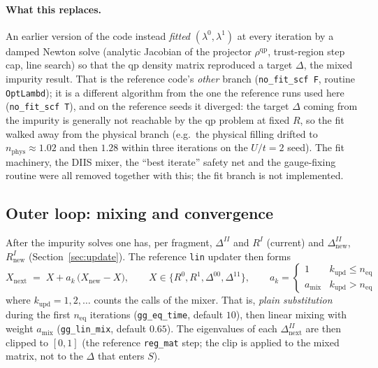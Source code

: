 \documentclass[11pt]{article}
\begin{document}
\paragraph{What this replaces.} An earlier version of the code instead
\emph{fitted} $(\lambda^0,\lambda^1)$ at every iteration by a damped Newton
solve (analytic Jacobian of the projector $\rho^{\mathrm{qp}}$, trust-region
step cap, line search) so that the qp density matrix
reproduced a target $\Delta$, the mixed impurity result. That is the
reference code's \emph{other} branch (\texttt{no\_fit\_scf F}, routine
\texttt{OptLambd}); it is a different algorithm from the one the reference
runs used here (\texttt{no\_fit\_scf T}), and on the reference seeds it
diverged: the target $\Delta$ coming from the impurity is generally not
reachable by the qp problem at fixed $R$, so the fit walked away from the
physical branch (e.g.\ the physical filling drifted to
$n_{\mathrm{phys}}\approx1.02$ and then $1.28$ within three iterations on the
$U/t=2$ seed). The fit machinery, the DIIS mixer, the ``best iterate''
safety net and the gauge-fixing routine were all removed together with this;
the fit branch is not implemented.

\subsection{Outer loop: mixing and convergence}
\label{sec:mixing}

After the impurity solves one has, per fragment, $\Delta^{II}$ and $R^I$
(current) and $\Delta^{II}_{\mathrm{new}}$, $R^I_{\mathrm{new}}$
(Section~\ref{sec:update}). The reference \texttt{lin} updater then forms
\begin{equation}
  X_{\mathrm{next}} \;=\; X + a_k\,\bigl(X_{\mathrm{new}}-X\bigr),\qquad
  X\in\{R^0,R^1,\Delta^{00},\Delta^{11}\},
  \qquad
  a_k=\begin{cases}1 & k_{\mathrm{upd}}\le n_{\mathrm{eq}}\\
                    a_{\mathrm{mix}} & k_{\mathrm{upd}}>n_{\mathrm{eq}}\end{cases}
  \label{eq:linmix}
\end{equation}
where $k_{\mathrm{upd}}=1,2,\dots$ counts the calls of the mixer. That is,
\emph{plain substitution} during the first $n_{\mathrm{eq}}$ iterations
(\texttt{gg\_eq\_time}, default $10$), then linear mixing with weight
$a_{\mathrm{mix}}$ (\texttt{gg\_lin\_mix}, default $0.65$). The eigenvalues of
each $\Delta^{II}_{\mathrm{next}}$ are then clipped to $[0,1]$ (the reference
\texttt{reg\_mat} step; the clip is applied to the mixed matrix, not to the
$\Delta$ that enters $S$).
\end{document}
